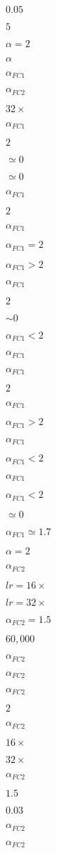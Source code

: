$0.05$

$5$

$\alpha=2$

$\alpha$

$\alpha_{FC1}$

$\alpha_{FC2}$

$32\times$

$\alpha_{FC1}$

$2$

$\simeq 0$

$\simeq 0$

$\alpha_{FC1}$

$2$

$\alpha_{FC1}$

$\alpha_{FC1} = 2$

$\alpha_{FC1} > 2$

$\alpha_{FC1}$

$2$

$\sim 0$

$\alpha_{FC1} < 2$

$\alpha_{FC1}$

$\alpha_{FC1}$

$2$

$\alpha_{FC1}$

$\alpha_{FC1} > 2$

$\alpha_{FC1}$

$\alpha_{FC1} < 2$

$\alpha_{FC1}$

$\alpha_{FC1} < 2$

$\simeq 0$

$\alpha_{FC1} \simeq 1.7$

$\alpha = 2$

$\alpha_{FC2}$

$lr=16\times$

$lr=32\times$

$\alpha_{FC2} = 1.5$

$60,000$

$\alpha_{FC2}$

$\alpha_{FC2}$

$\alpha_{FC2}$

$2$

$\alpha_{FC2}$

$16\times$

$32\times$

$\alpha_{FC2}$

$1.5$

$0.03$

$\alpha_{FC2}$

$\alpha_{FC2}$

